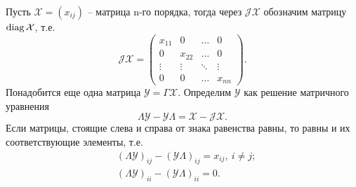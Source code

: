 Пусть $\mathcal{X} = (x_{ij})$ -- матрица n-го порядка, тогда через $\mathcal{JX}$ обозначим матрицу $\operatorname{diag}\mathcal{X}$, т.е.
\begin{equation}\label{JXmatrix}
\mathcal{JX} = \begin{pmatrix}
x_{11} &   0    & \dots  &   0    \\
  0    & x_{22} & \dots  &   0    \\
\vdots & \vdots & \ddots & \vdots \\
  0    &   0    & \dots  & x_{nn}
\end{pmatrix}.
\end{equation}
Понадобится еще одна матрица $\mathcal{Y} = \Gamma\mathcal{X}$. Определим $\mathcal{Y}$ как решение матричного уравнения
\begin{equation}\label{equationForY}
\Lambda\mathcal{Y} - \mathcal{Y}\Lambda = \mathcal{X} - \mathcal{JX}.
\end{equation}
Если матрицы, стоящие слева и справа от знака равенства равны, то равны и их соответствующие элементы, т.е.
\begin{align}
&(\Lambda\mathcal{Y})_{ij} - (\mathcal{Y}\Lambda)_{ij} = x_{ij},\ i \ne j; \label{elementsOfequationForY1}\\
&(\Lambda\mathcal{Y})_{ii} - (\mathcal{Y}\Lambda)_{ii} = 0. \label{elementsOfequationForY2}
\end{align} 